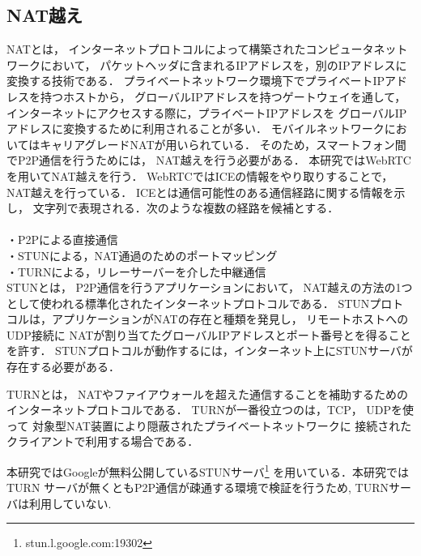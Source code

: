 \documentclass[sotsuron]{jcsie}
\begin{document}
\subsection{NAT越え}
NATとは，
インターネットプロトコルによって構築されたコンピュータネットワークにおいて，
パケットヘッダに含まれるIPアドレスを，別のIPアドレスに変換する技術である．
プライベートネットワーク環境下でプライベートIPアドレスを持つホストから，
グローバルIPアドレスを持つゲートウェイを通して，
インターネットにアクセスする際に，プライベートIPアドレスを
グローバルIPアドレスに変換するために利用されることが多い．
モバイルネットワークにおいてはキャリアグレードNATが用いられている．
そのため，スマートフォン間でP2P通信を行うためには，
NAT越えを行う必要がある．
本研究ではWebRTCを用いてNAT越えを行う．
WebRTCではICEの情報をやり取りすることで，NAT越えを行っている．
ICEとは通信可能性のある通信経路に関する情報を示し，
文字列で表現される．次のような複数の経路を候補とする．
\\\\
・P2Pによる直接通信\\
・STUNによる，NAT通過のためのポートマッピング\\
・TURNによる，リレーサーバーを介した中継通信\\

STUN\cite{wing2008session}とは，
P2P通信を行うアプリケーションにおいて，
NAT越えの方法の1つとして使われる標準化されたインターネットプロトコルである．
STUNプロトコルは，アプリケーションがNATの存在と種類を発見し，
リモートホストへのUDP接続に
NATが割り当てたグローバルIPアドレスとポート番号とを得ることを許す．
STUNプロトコルが動作するには，インターネット上にSTUNサーバが存在する必要がある．

TURN\cite{matthews2010traversal}とは，
NATやファイアウォールを超えた通信することを補助するための
インターネットプロトコルである．
TURNが一番役立つのは，TCP， UDPを使って
対象型NAT装置により隠蔽されたプライベートネットワークに
接続されたクライアントで利用する場合である．

本研究ではGoogleが無料公開しているSTUNサーバ\footnote{stun.l.google.com:19302}
を用いている．本研究ではTURN
サーバが無くともP2P通信が疎通する環境で検証を行うため,
TURNサーバは利用していない.
\end{document}
